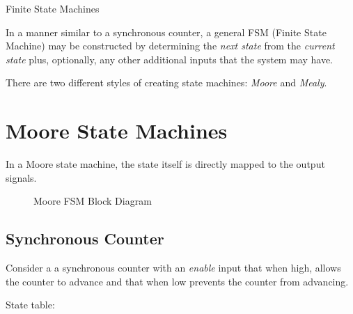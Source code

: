 \documentclass[10pt,letterpaper]{article}
\begin{document}
\thispagestyle{fancy}

\begin{center}
{\huge Finite State Machines}
\end{center}
\vspace{.5in}

In a manner similar to a synchronous counter, a general FSM 
(Finite State Machine) may be constructed by determining the {\em next state}
from the {\em current state} plus, optionally, any other additional inputs 
that the system may have.

There are two different styles of creating state machines: {\em Moore} and {\em Mealy}.




\section{Moore State Machines}

In a Moore state machine, the state itself is directly mapped to the output signals.

\begin{figure}[ht]
\centering

\scalebox{.75}{}

\caption{Moore FSM Block Diagram}
\label{wav:moore.block.diagram}
\end{figure}

\subsection{Synchronous Counter}

Consider a a synchronous counter with an {\em enable} input that when 
high, allows the counter to advance and that when low prevents the counter
from advancing.

State table:
\end{document}
